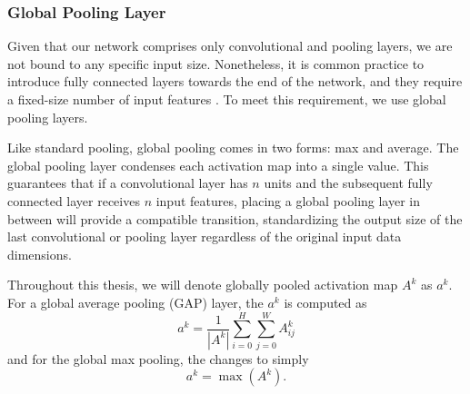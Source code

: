 \subsubsection{Global Pooling Layer}

Given that our network comprises only convolutional and pooling layers, we are not bound to any specific input size.
Nonetheless, it is common practice to introduce fully connected layers towards the end of the network, and they require a fixed-size number of input features \cite{cnns}.
To meet this requirement, we use global pooling layers.

Like standard pooling, global pooling comes in two forms: max and average.
The global pooling layer condenses each activation map into a single value.
This guarantees that if a convolutional layer has $n$ units and the subsequent fully connected layer receives $n$ input features, placing a global pooling layer in between will provide a compatible transition, standardizing the output size of the last convolutional or pooling layer regardless of the original input data dimensions.

Throughout this thesis, we will denote globally pooled activation map $A^k$ as $a^k$. For a global average pooling (GAP) layer, the $a^k$ is computed as
\begin{equation}\label{gap}
    a^k = \frac{1}{|A^k|} \sum_{i=0}^H \sum_{j=0}^W A^k_{ij}
\end{equation}
and for the global max pooling, the  changes to simply
\begin{equation}
    a^k = \max(A^k).
\end{equation}